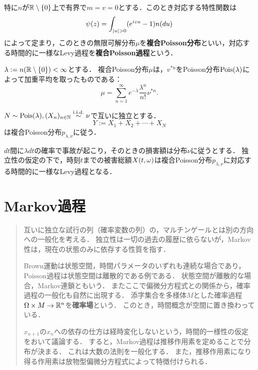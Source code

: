 \documentclass[uplatex,dvipdfmx]{jsreport}
\begin{document}
\begin{definition}
    特に$n$が$\mathbb{R}\setminus\{0\}$上で有界で$m=v=0$とする．このとき対応する特性関数は
    \[\psi(z)=\int_{\lvert u\rvert>0}(e^{izu}-1)n(du)\]
    によって定まり，このときの無限可解分布$\mu$を\textbf{複合Poisson分布}といい，対応する時間的に一様なLevy過程を\textbf{複合Poisson過程}という．
\end{definition}

\begin{lemma}[複合Poisson分布の特徴付け]
    $\lambda:=n(\mathbb{R}\setminus\{0\})<\infty$とする．
    複合Poisson分布$\mu$は，$v^{*n}$をPoisson分布$\mathrm{Pois}(\lambda)$によって加重平均を取ったものである：
    \[\mu=\sum^\infty_{n=1}e^{-\lambda}\frac{\lambda^n}{n!}\nu^{*n}.\]
\end{lemma}

\begin{proposition}
    $N\sim\mathrm{Pois}(\lambda),(X_n)_{n\in\mathbb{N}}\overset{\mathrm{i.i.d.}}{\sim}\nu$で互いに独立とする．
    \[Y:=X_1+X_2+\cdots+X_N\]
    は複合Poisson分布$p_{\lambda,\nu}$に従う．
\end{proposition}
\begin{remarks}
    $dt$間に$\lambda dt$の確率で事故が起こり，そのときの損害額は分布$\nu$に従うとする．
    独立性の仮定の下で，時刻$t$までの被害総額$X(t,\omega)$は複合Poisson分布$p_{\lambda,\nu}$に対応する時間的に一様なLevy過程となる．
\end{remarks}

\chapter{Markov過程}

\begin{quotation}
    互いに独立な試行の列（確率変数の列）の，マルチンゲールとは別の方向への一般化を考える．
    独立性は一切の過去の履歴に依らないが，Markov性は，現在の状態のみに依存する性質を指す．

    Brown運動は状態空間，時間パラメータのいずれも連続な場合であり，Poisson過程は状態空間は離散的である例である．
    状態空間が離散的な場合，Markov連鎖ともいう．
    またここで偏微分方程式との関係から，確率過程の一般化も自然に出現する．
    添字集合を多様体$M$とした確率過程$\Omega\times M\to\mathbb{R}^n$を\textbf{確率場}という．
    このとき，時間概念が空間に置き換わっている．

    $x_{n+1}$の$x_n$への依存の仕方は経時変化しないという，時間的一様性の仮定をおいて議論する．
    すると，Markov過程は推移作用素を定めることで分布が決まる．
    これは大数の法則を一般化する．
    また，推移作用素になり得る作用素は放物型偏微分方程式によって特徴付けられる．
\end{quotation}
\end{document}

